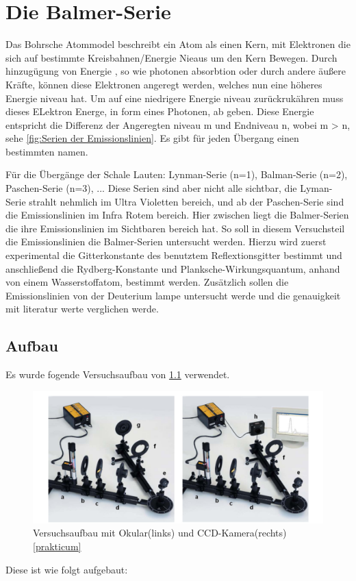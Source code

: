 \chapter{Die Balmer-Serie}

Das Bohrsche Atommodel beschreibt ein Atom als einen Kern, mit Elektronen die sich auf bestimmte Kreisbahnen/Energie Nieaus um den Kern Bewegen.
Durch hinzugügung von Energie , so wie photonen absorbtion oder durch andere äußere Kräfte, können diese Elektronen angeregt werden, welches nun eine höheres Energie niveau hat. 
Um auf eine niedrigere Energie niveau zurückrukähren muss dieses ELektron Energe, in form eines Photonen, ab geben. 
Diese Energie entspricht die Differenz der Angeregten niveau m und Endniveau n, wobei m > n, sehe \cref{fig:Serien der Emissionslinien}. 
Es gibt für jeden Übergang einen bestimmten namen. 


Für die Übergänge der Schale Lauten: Lynman-Serie (n=1), Balman-Serie (n=2), Paschen-Serie (n=3), ...
Diese Serien sind aber nicht alle sichtbar, die Lyman-Serie strahlt nehmlich im Ultra Violetten bereich, und ab der Paschen-Serie sind die Emissionslinien im Infra Rotem bereich.
Hier zwischen liegt die Balmer-Serien die ihre Emissionslinien im Sichtbaren bereich hat.
So soll in diesem Versuchsteil die Emissionslinien die Balmer-Serien untersucht werden. 
Hierzu wird zuerst experimental die Gitterkonstante des benutztem Reflextionsgitter bestimmt und anschließend die Rydberg-Konstante und Planksche-Wirkungsquantum, anhand von einem Wasserstoffatom, bestimmt werden.
Zusätzlich sollen die Emissionslinien von der Deuterium lampe untersucht werde und die genauigkeit mit literatur werte verglichen werde.


\section{Aufbau}

Es wurde fogende Versuchsaufbau von \cref{fig:balmeraufbau} verwendet. 

\begin{figure}[htbp]
    \centering
    \includegraphics[width=0.7\linewidth]{figs/aufbau_balmer_serie.png}
    \caption{Versuchsaufbau mit Okular(links) und CCD-Kamera(rechts) \ref{prakticum}}
    \label{fig:balmeraufbau}
\end{figure}
Diese ist wie folgt aufgebaut: 

